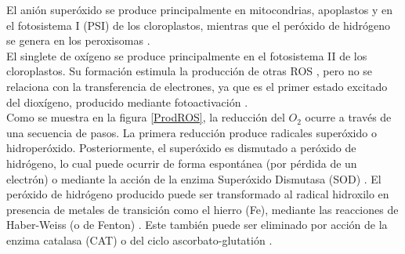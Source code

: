 El ani\'on super\'oxido se produce principalmente en  mitocondrias, apoplastos y en el fotosistema I (PSI) de los cloroplastos, mientras que el per\'oxido de hidr\'ogeno se genera en los peroxisomas \citep{gechev2006reactive, halliwell2006reactive}. \\

El singlete de ox\'igeno se produce principalmente en el fotosistema II de los cloroplastos. Su formación estimula la producción de  otras ROS \citep{buchanan2015biochemistry}, pero no se relaciona con la transferencia de electrones, ya que es el primer estado excitado del diox\'igeno, producido mediante fotoactivaci\'on \citep{triantaphylides2009singlet}. \\
 

Como se muestra en la figura \ref{ProdROS}, la reducción del $O_2$ ocurre a trav\'es de una secuencia de pasos. La primera reducción produce radicales superóxido o hidroperóxido. Posteriormente, el super\'oxido es dismutado a per\'oxido de hidr\'ogeno, lo cual puede ocurrir de forma espont\'anea (por p\'erdida de un electr\'on) o mediante la acci\'on de la enzima Super\'oxido Dismutasa (SOD) \citep{gechev2006reactive}. El per\'oxido de hidr\'ogeno producido puede ser transformado al radical hidroxilo en presencia de metales de transición como el hierro (Fe), mediante las reacciones de Haber-Weiss (o de Fenton) \citep{dat2000active}. Este tambi\'en puede ser eliminado por acción de la enzima catalasa (CAT) o del ciclo ascorbato-glutatión \citep{blokhina2003antioxidants, rinalducci2008redox}.\\

